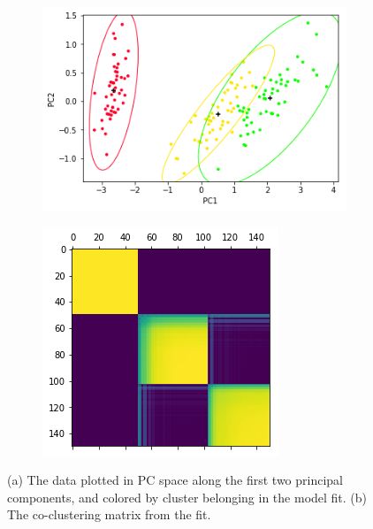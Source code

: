\documentclass[a4paper]{article}
\begin{document}
\begin{figure}[h!]
	\centering
	\begin{subfigure}[t]{0.4\textwidth}
		\includegraphics[width = \textwidth]{./data_figs/iris_lucky_clustering.png}
		\subcaption{}
	\end{subfigure}
  \begin{subfigure}[t]{0.3\textwidth}
    \includegraphics[width = \textwidth]{./data_figs/iris_lucky_clustering_coclust_mat.png}
		\subcaption{}
  \end{subfigure}
	\caption{(a) The data plotted in PC space along the first two principal components, and colored by
	cluster belonging in the model fit.
	(b) The co-clustering matrix from the fit. }
	\label{fig:lucky_fit}
\end{figure}
\end{document}
